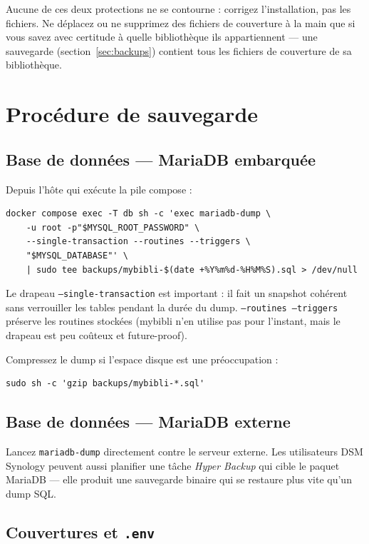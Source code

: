 Aucune de ces deux protections ne se contourne : corrigez
l'installation, pas les fichiers. Ne
déplacez ou ne supprimez des fichiers de couverture à la main que si
vous savez avec certitude à quelle bibliothèque ils appartiennent ---
une sauvegarde (section~\ref{sec:backups}) contient tous les fichiers de
couverture de sa bibliothèque.

\section{Procédure de sauvegarde}

\subsection*{Base de données — MariaDB embarquée}

Depuis l'hôte qui exécute la pile compose :

\begin{lstlisting}
docker compose exec -T db sh -c 'exec mariadb-dump \
    -u root -p"$MYSQL_ROOT_PASSWORD" \
    --single-transaction --routines --triggers \
    "$MYSQL_DATABASE"' \
    | sudo tee backups/mybibli-$(date +%Y%m%d-%H%M%S).sql > /dev/null
\end{lstlisting}

Le drapeau \texttt{--single-transaction} est important : il fait un
snapshot cohérent sans verrouiller les tables pendant la durée du
dump. \texttt{--routines --triggers} préserve les routines stockées
(mybibli n'en utilise pas pour l'instant, mais le drapeau est peu
coûteux et future-proof).

Compressez le dump si l'espace disque est une préoccupation :

\begin{lstlisting}
sudo sh -c 'gzip backups/mybibli-*.sql'
\end{lstlisting}

\subsection*{Base de données — MariaDB externe}

Lancez \texttt{mariadb-dump} directement contre le serveur externe.
Les utilisateurs DSM Synology peuvent aussi planifier une tâche
\emph{Hyper Backup} qui cible le paquet MariaDB — elle produit une
sauvegarde binaire qui se restaure plus vite qu'un dump SQL.

\subsection*{Couvertures et \texttt{.env}}

